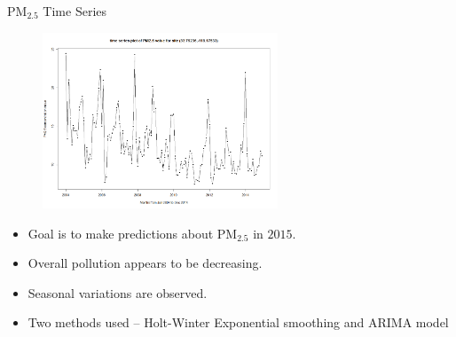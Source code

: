 \documentclass[notheorems,envcountsect,allowframebreaks,xcolor=svgnames,8pt]{beamer}
\begin{document}
\begin{frame}{PM$_{2.5}$ Time Series}
\begin{figure}
\centering
\includegraphics[width=70mm]{figs/ts1.png}
\end{figure}
\begin{itemize}
\item Goal is to make predictions about PM$_{2.5}$ in $2015$.
\item Overall pollution appears to be decreasing.
\item Seasonal variations are observed.
\item Two methods used -- Holt-Winter Exponential smoothing and ARIMA model 
\end{itemize}  
\end{frame}
\end{document}
